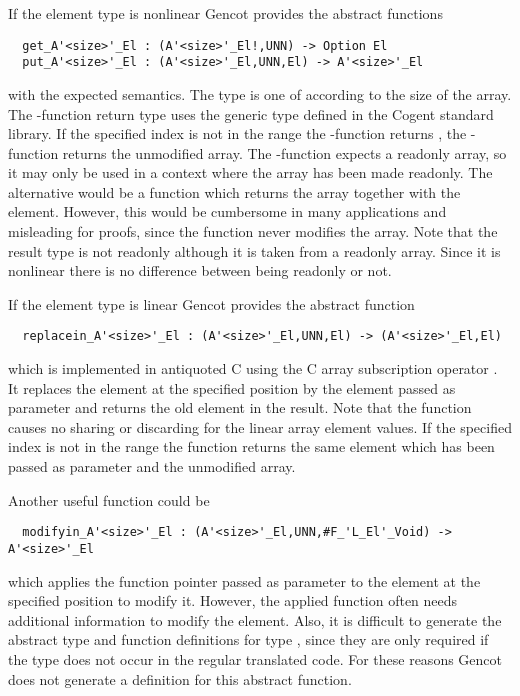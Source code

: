 If the element type is nonlinear Gencot provides the abstract functions
\begin{verbatim}
  get_A'<size>'_El : (A'<size>'_El!,UNN) -> Option El
  put_A'<size>'_El : (A'<size>'_El,UNN,El) -> A'<size>'_El
\end{verbatim}
with the expected semantics. The type  is one of  according to the size of the array.
The -function return type uses the generic type  defined in
the Cogent standard library. If the specified index is not in the range  the 
-function returns , the -function returns the unmodified array. The -function 
expects a readonly array, so it may only be used in a context where
the array has been made readonly. The alternative would be a function which returns the array together with the element.
However, this would be cumbersome in many applications and misleading for proofs, since the function never modifies
the array. Note that the result type is not readonly although it is taken from a readonly array. Since it is nonlinear
there is no difference between being readonly or not.

If the element type is linear Gencot provides the abstract function
\begin{verbatim}
  replacein_A'<size>'_El : (A'<size>'_El,UNN,El) -> (A'<size>'_El,El)
\end{verbatim}
which is implemented in antiquoted C using the C array subscription operator \code{[]}. It
replaces the element at the specified position by the element passed as parameter and returns the old element in the result.
Note that the function causes no sharing or discarding for the linear array element values. If the specified
index is not in the range  the function returns the same element which has been
passed as parameter and the unmodified array.

Another useful function could be 
\begin{verbatim}
  modifyin_A'<size>'_El : (A'<size>'_El,UNN,#F_'L_El'_Void) -> A'<size>'_El
\end{verbatim}
which applies the function pointer passed as parameter to the element at the specified position to modify it. However, the applied
function often needs additional information to modify the element. Also, it is difficult to generate the abstract
type and function definitions for type , since they are only required if the type does not occur in
the regular translated code. For these reasons Gencot does not generate a definition for this abstract function.

